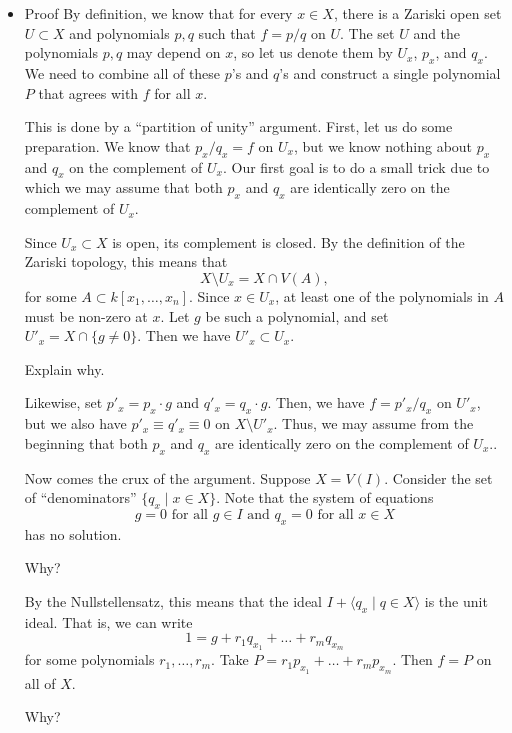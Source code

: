 \documentclass[11pt]{article}
\begin{document}
\begin{itemize}
\item Proof
\label{sec:org912b3d5}
By definition, we know that for every \(x \in X\), there is a Zariski open set \(U \subset X\) and polynomials \(p, q\) such that \(f = p/q\) on \(U\).
The set \(U\) and the polynomials \(p, q\) may depend on \(x\), so let us denote them by \(U_x\), \(p_x\), and  \(q_x\).
We need to combine all of these \(p\)'s and \(q\)'s and construct a single polynomial \(P\) that agrees with \(f\) for all \(x\).

This is done by a ``partition of unity'' argument.
First, let us do some preparation.
We know that \(p_x / q_x = f\) on \(U_x\), but we know nothing about \(p_x\) and \(q_x\) on the complement of \(U_x\).
Our first goal is to do a small trick due to which we may assume that both \(p_x\) and \(q_x\) are identically zero on the complement of \(U_x\).

Since \(U_x \subset X\) is open, its complement is closed.
By the definition of the Zariski topology, this means that
\[X \setminus U_x = X \cap V(A),\]
for some \(A \subset k[x_1,\dots, x_n]\).
Since \(x \in U_x\), at least one of the polynomials in \(A\) must be non-zero at \(x\).
Let \(g\) be such a polynomial, and set \(U'_x = X \cap \{g \neq 0\}\).
Then we have \(U'_x \subset U_x\).
\begin{skipped}
Explain why.
\end{skipped}
Likewise, set \(p'_x = p_x \cdot g\) and \(q'_x = q_x \cdot g\).
Then, we have \(f = p'_x/q_x\) on \(U'_x\), but we also have \(p'_x \equiv q'_x \equiv 0\) on \(X \setminus U'_x\).
Thus, we may assume from the beginning that both \(p_x\) and \(q_x\) are identically zero on the complement of \(U_x\)..

Now comes the crux of the argument.
Suppose \(X = V(I)\).
Consider the set of ``denominators'' \(\{q_x \mid x \in X\}\).
Note that the system of equations
\[ g = 0 \text{ for all } g \in I \text{ and } q_x = 0 \text{ for all } x \in X\]
has no solution.
\begin{skipped}
Why?
\end{skipped}
By the Nullstellensatz, this means that the ideal \(I + \langle q_x \mid q \in X \rangle\) is the unit ideal.
That is, we can write
\[ 1 = g + r_1q_{x_1} + \dots + r_m q_{x_m}\]
for some polynomials \(r_1, \dots, r_m\).
Take \(P = r_1p_{x_1} + \dots + r_m p_{x_m}\).
Then \(f = P\) on all of \(X\).
\begin{skipped}
Why?
\end{skipped}
\end{itemize}
\end{document}

